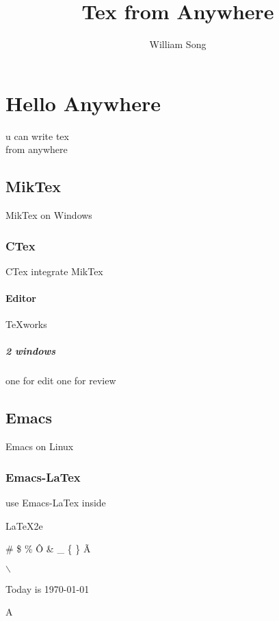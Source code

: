 \documentclass{article}
\author{William Song}
\title{Tex from Anywhere}
\begin{document}

\tableofcontents


	\section{Hello Anywhere} u can write tex\\ from anywhere
		\subsection{MikTex} MikTex on
Windows
			\subsubsection{CTex}CTex integrate MikTex
				\paragraph{Editor}TeXworks
					\subparagraph{2 windows}one for edit one for review
		\subsection{Emacs}Emacs on Linux
			\subsubsection{Emacs-LaTex}use Emacs-LaTex inside
\newline

\LaTeX2e \newline

\# \$ \% \^{O} \& \_ \{ \}   \~{A}

 $\backslash$

Today is \today

\begin{comment}
so, so
you think
you can tell
heaven from hell
\end{comment}
A
\\
\\
\\
\\
\\
\\%
\\
\\
\\
\\
\\
\end{document}
